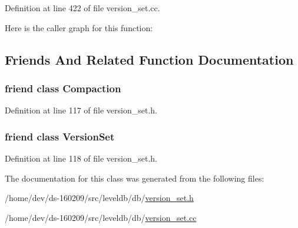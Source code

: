 Definition at line 422 of file version\+\_\+set.\+cc.



Here is the caller graph for this function\+:




\subsection{Friends And Related Function Documentation}
\hypertarget{classleveldb_1_1_version_a9372e882b35d27c78356228e4b758917}{}
\subsubsection[{Compaction}]{\setlength{\rightskip}{0pt plus 5cm}friend class {\bf Compaction}\hspace{0.3cm}{\ttfamily [friend]}}\label{classleveldb_1_1_version_a9372e882b35d27c78356228e4b758917}


Definition at line 117 of file version\+\_\+set.\+h.

\hypertarget{classleveldb_1_1_version_a1827cd1b4d6e9e3c378ce37ca3cce635}{}
\subsubsection[{Version\+Set}]{\setlength{\rightskip}{0pt plus 5cm}friend class {\bf Version\+Set}\hspace{0.3cm}{\ttfamily [friend]}}\label{classleveldb_1_1_version_a1827cd1b4d6e9e3c378ce37ca3cce635}


Definition at line 118 of file version\+\_\+set.\+h.



The documentation for this class was generated from the following files\+:\begin{DoxyCompactItemize}
\item 
/home/dev/ds-\/160209/src/leveldb/db/\hyperlink{version__set_8h}{version\+\_\+set.\+h}\item 
/home/dev/ds-\/160209/src/leveldb/db/\hyperlink{version__set_8cc}{version\+\_\+set.\+cc}\end{DoxyCompactItemize}
